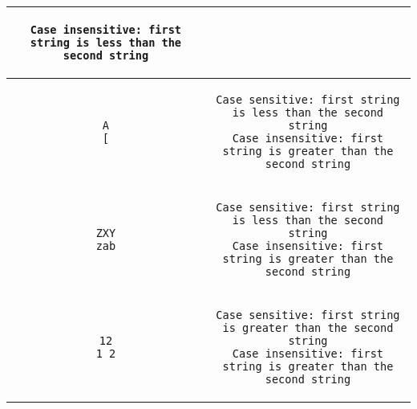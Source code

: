 \documentclass[a4paper]{scrartcl}
\theoremstyle{definition}
\begin{document}
\begin{center}
\begin{tabular}{c|c}
\begin{minipage}{33.7em}
\begin{verbatim}
Case insensitive: first string is less than the second string
\end{verbatim}
\end{minipage}\\
\hline
\begin{minipage}{.9\textwidth-33.7em}
\begin{verbatim}
A
[
\end{verbatim}
\end{minipage}&
\begin{minipage}{33.7em}
\begin{verbatim}
Case sensitive: first string is less than the second string
Case insensitive: first string is greater than the second string
\end{verbatim}
\end{minipage}\\
\hline
\begin{minipage}{.9\textwidth-33.7em}
\begin{verbatim}
ZXY
zab
\end{verbatim}
\end{minipage}&
\begin{minipage}{33.7em}
\begin{verbatim}
Case sensitive: first string is less than the second string
Case insensitive: first string is greater than the second string
\end{verbatim}
\end{minipage}\\
\hline
\begin{minipage}{.9\textwidth-33.7em}
\begin{verbatim}
12
1 2
\end{verbatim}
\end{minipage}&
\begin{minipage}{33.7em}
\begin{verbatim}
Case sensitive: first string is greater than the second string
Case insensitive: first string is greater than the second string
\end{verbatim}
\end{minipage}
\end{tabular}
\end{center}
\end{document}
